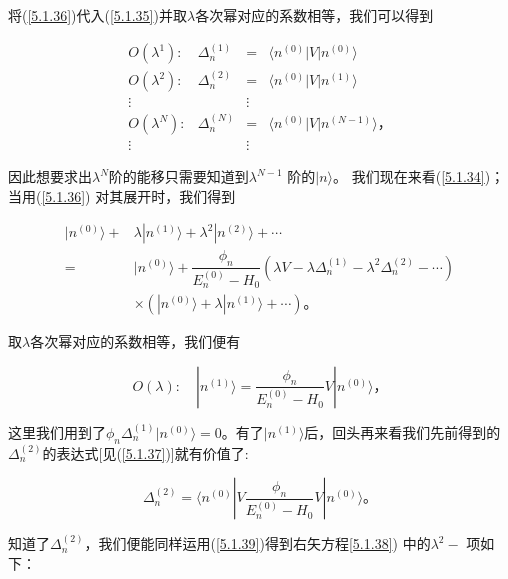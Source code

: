 ﻿\documentclass[UTF8,twoside]{ctexart}
\begin{document}
\noindent 将(\ref{5.1.36})代入(\ref{5.1.35})并取$\lambda$各次幂对应的系数相等，我们可以得到

\begin{equation} \label{5.1.37}
\begin{array}{cccc}
O(\lambda^1): & \Delta_n^{(1)} & = & \langle n^{(0)}|V|n^{(0)}\rangle  \\
O(\lambda^2): & \Delta_n^{(2)} & = & \langle n^{(0)}|V|n^{(1)}\rangle  \\
\vdots & \quad & \vdots & \quad \\
O(\lambda^N): & \Delta_n^{(N)} & = & \langle n^{(0)}|V|n^{(N-1)}\rangle\text{，}  \\
\vdots & \quad & \vdots & \quad
\end{array}
\end{equation}

\noindent 因此想要求出$\lambda^N$阶的能移只需要知道到$\lambda^{N-1}$ 阶的$|n\rangle$。 我们现在来看(\ref{5.1.34})；当用(\ref{5.1.36}) 对其展开时，我们得到

\begin{equation} \label{5.1.38}
\begin{split}
|n^{(0)}\rangle + &\lambda|n^{(1)}\rangle + \lambda^2|n^{(2)}\rangle + \cdots \\
= &|n^{(0)}\rangle + \dfrac{\phi_n}{E_n^{(0)}-H_0}(\lambda V - \lambda\Delta_n^{(1)} - \lambda^2\Delta_n^{(2)} - \cdots) \\
&\times(|n^{(0)}\rangle + \lambda|n^{(1)}\rangle+\cdots)\text{。}
\end{split}
\end{equation}

\noindent 取$\lambda$各次幂对应的系数相等，我们便有

\begin{equation} \label{5.1.39}
O(\lambda):\quad|n^{(1)}\rangle = \dfrac{\phi_n}{E_n^{(0)}-H_0}V|n^{(0)}\rangle\text{，}
\end{equation}

\noindent 这里我们用到了$\phi_n\Delta_n^{(1)}|n^{(0)}\rangle = 0$。有了$|n^{(1)}\rangle$后，回头再来看我们先前得到的$\Delta_n^{(2)}$的表达式[见(\ref{5.1.37})]就有价值了:

\begin{equation} \label{5.1.40}
\Delta_n^{(2)} = \langle n^{(0)}|V\dfrac{\phi_n}{E_n^{(0)}-H_0}V|n^{(0)}\rangle\text{。}
\end{equation}

\noindent 知道了$\Delta_n^{(2)}$，我们便能同样运用(\ref{5.1.39})得到右矢方程\ref{5.1.38}) 中的$\lambda^2-$ 项如下：
\end{document}
